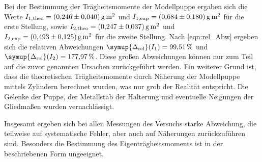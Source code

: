 Bei der Bestimmung der Trägheitsmomente der Modellpuppe ergaben sich die Werte $I_{1\text{,theo}} = \qty{0.246+-0.040}{\gram\metre\squared}$ und 
$I_{1\text{,exp}} = \qty{0.684+-0.180}{\gram\metre\squared}$ für die erste Stellung, sowie $I_{2\text{,theo}} = \qty{0.247+-0.037}{\gram\metre\squared}$ und 
$I_{2\text{,exp}} = \qty{0.493+-0.125}{\gram\metre\squared}$ für die zweite Stellung. Nach \autoref{eqn:rel_Abw} ergeben sich die relativen Abweichungen 
$\symup{\Delta_\text{rel}}(I_1) = \qty{99.51}{\percent}$ und $\symup{\Delta_\text{rel}}(I_2) = \qty{177.97}{\percent}$. Diese großen Abweichungen können nur zum Teil
auf die zuvor genannten Ursachen zurückgeführt werden. Ein weiterer Grund ist, dass die theoretischen Trägheitsmomente durch Näherung der Modellpuppe mittels Zylindern berechnet
wurden, was nur grob der Realität entspricht. Die Gelenke der Puppe, der Metallstab der Halterung und eventuelle Neigungen der Gliedmaßen wurden vernachlässigt.

Insgesamt ergeben sich bei allen Messungen des Versuchs starke Abweichung, die teilweise auf systematische Fehler, aber auch auf Näherungen zurückzuführen sind. Besonders die 
Bestimmung des Eigenträgheitsmoments ist in der beschriebenen Form ungeeignet. 
